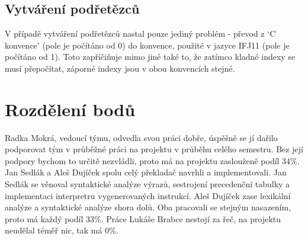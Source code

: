 \documentclass[a4paper,11pt,titlepage]{article}
\begin{document}
\subsection{Vytváření podřetězců}

V případě vytváření podřetězců nastal pouze jediný problém - převod z `C konvence' (pole je počítáno od 0) do konvence, použité v jazyce IFJ11 (pole je počítáno od 1). Toto zapříčiňuje mimo jiné také to, že zatímco kladné indexy se musí přepočítat, záporné indexy jsou v obou konvencích stejné.

\section{Rozdělení bodů}

Radka Mokrá, vedoucí týmu, odvedla svou práci dobře, úspěšně se jí dařilo podporovat tým v průběžné práci na projektu v průběhu celého semestru. Bez její podpory bychom to určitě nezvládli, proto má na projektu zaslouženě podíl 34\%. Jan Sedlák a Aleš Dujíček spolu celý překladač navrhli a implementovali. Jan Sedlák se věnoval syntaktické analýze výrazů, sestrojení precedenční tabulky a implementaci interpretru vygenerovaných instrukcí. Aleš Dujíček zase lexikální analýze a syntaktické analýze shora dolů. Oba pracovali se stejným nasazením, proto má každý podíl 33\%. Práce Lukáše Brabce nestojí za řeč, na projektu neudělal téměř nic, tak má 0\%.
\end{document}

